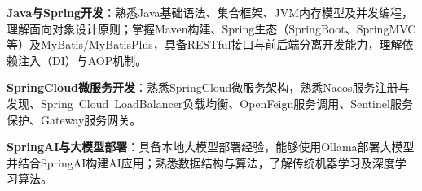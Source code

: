 \item \textbf{Java与Spring开发}：熟悉Java基础语法、集合框架、JVM内存模型及并发编程，理解面向对象设计原则；掌握Maven构建、Spring生态（SpringBoot、SpringMVC等）及MyBatis/MyBatisPlus，具备RESTful接口与前后端分离开发能力，理解依赖注入（DI）与AOP机制。
\item \textbf{SpringCloud微服务开发}：熟悉SpringCloud微服务架构，熟悉Nacos服务注册与发现、Spring Cloud LoadBalancer负载均衡、OpenFeign服务调用、Sentinel服务保护、Gateway服务网关。
\item \textbf{SpringAI与大模型部署}：具备本地大模型部署经验，能够使用Ollama部署大模型并结合SpringAI构建AI应用；熟悉数据结构与算法，了解传统机器学习及深度学习算法。